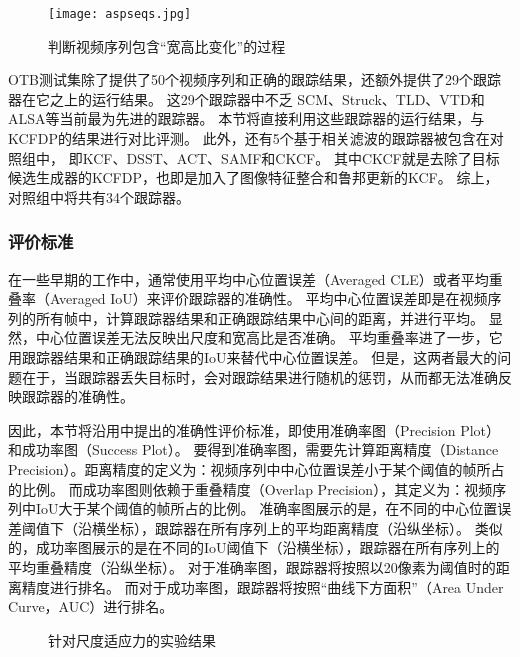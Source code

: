 \begin{figure}[htb]
	\centering
		\texttt{[image: aspseqs.jpg]}
	\caption{判断视频序列包含``宽高比变化''的过程}
	\label{aspseqs}
\end{figure}

OTB测试集除了提供了50个视频序列和正确的跟踪结果，还额外提供了29个跟踪器在它之上的运行结果。
这29个跟踪器中不乏
SCM、Struck、TLD、VTD和ALSA等当前最为先进的跟踪器。
本节将直接利用这些跟踪器的运行结果，与KCFDP的结果进行对比评测。
此外，还有5个基于相关滤波的跟踪器被包含在对照组中，
即KCF、DSST、ACT、SAMF和CKCF。
其中CKCF就是去除了目标候选生成器的KCFDP，也即是加入了图像特征整合和鲁邦更新的KCF。
综上，对照组中将共有34个跟踪器。

\subsubsection{评价标准}
\label{evalcriteriasec}
在一些早期的工作中，通常使用平均中心位置误差（Averaged CLE）或者平均重叠率（Averaged IoU）来评价跟踪器的准确性。
平均中心位置误差即是在视频序列的所有帧中，计算跟踪器结果和正确跟踪结果中心间的距离，并进行平均。
显然，中心位置误差无法反映出尺度和宽高比是否准确。
平均重叠率进了一步，它用跟踪器结果和正确跟踪结果的IoU来替代中心位置误差。
但是，这两者最大的问题在于，当跟踪器丢失目标时，会对跟踪结果进行随机的惩罚，从而都无法准确反映跟踪器的准确性。

因此，本节将沿用\cite{50seqs}中提出的准确性评价标准，即使用准确率图（Precision Plot）和成功率图（Success Plot）。
要得到准确率图，需要先计算距离精度（Distance Precision）。距离精度的定义为：视频序列中中心位置误差小于某个阈值的帧所占的比例。
而成功率图则依赖于重叠精度（Overlap Precision），其定义为：视频序列中IoU大于某个阈值的帧所占的比例。
准确率图展示的是，在不同的中心位置误差阈值下（沿横坐标），跟踪器在所有序列上的平均距离精度（沿纵坐标）。
类似的，成功率图展示的是在不同的IoU阈值下（沿横坐标），跟踪器在所有序列上的平均重叠精度（沿纵坐标）。
对于准确率图，跟踪器将按照以20像素为阈值时的距离精度进行排名。
而对于成功率图，跟踪器将按照``曲线下方面积''（Area Under Curve，AUC）进行排名。

\begin{figure}[htb]
  \centering
  \hspace{-2.2cm}
  \newline
  \caption{针对尺度适应力的实验结果}
  \label{result1}
\end{figure}

